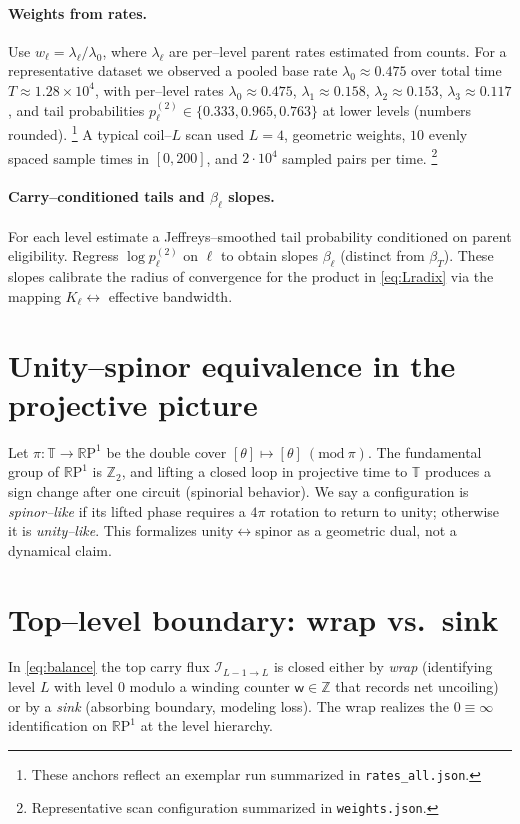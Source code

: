 \documentclass[11pt]{article}
\newcommand{\Z}{\mathbb{Z}}
\newcommand{\T}{\mathbb{T}} %
\newcommand{\RP}{\mathbb{R}\mathrm{P}^1}
\begin{document}
\paragraph{Weights from rates.}
Use $w_\ell=\lambda_\ell/\lambda_0$, where $\lambda_\ell$ are per--level parent rates estimated from counts.
For a representative dataset we observed a pooled base rate $\lambda_0\approx 0.475$ over total time $T\approx 1.28\times 10^4$, with per--level rates $\lambda_0\approx 0.475$, $\lambda_1\approx 0.158$, $\lambda_2\approx 0.153$, $\lambda_3\approx 0.117$, and tail probabilities $p^{(2)}_\ell\in\{0.333,0.965,0.763\}$ at lower levels (numbers rounded).%
\footnote{These anchors reflect an exemplar run summarized in \texttt{rates\_all.json}.}
A typical coil--$L$ scan used $L=4$, geometric weights, $10$ evenly spaced sample times in $[0,200]$, and $2\cdot 10^4$ sampled pairs per time.%
\footnote{Representative scan configuration summarized in \texttt{weights.json}.}

\paragraph{Carry--conditioned tails and $\beta_\ell$ slopes.}
For each level estimate a Jeffreys--smoothed tail probability conditioned on parent eligibility. Regress $\log p^{(2)}_\ell$ on $\ell$ to obtain slopes $\beta_\ell$ (distinct from $\beta_T$). These slopes calibrate the radius of convergence for the product in \eqref{eq:Lradix} via the mapping $K_\ell\leftrightarrow$ effective bandwidth.

\section{Unity--spinor equivalence in the projective picture}
\label{sec:spinor}
Let $\pi:\T\to \RP$ be the double cover $[\theta]\mapsto [\theta]\ (\mathrm{mod}\ \pi)$. The fundamental group of $\RP$ is $\Z_2$, and lifting a closed loop in projective time to $\T$ produces a sign change after one circuit (spinorial behavior). We say a configuration is \emph{spinor--like} if its lifted phase requires a $4\pi$ rotation to return to unity; otherwise it is \emph{unity--like}. This formalizes unity$\leftrightarrow$spinor as a geometric dual, not a dynamical claim.

\section{Top--level boundary: wrap vs.\ sink}
\label{sec:wrap}
In \eqref{eq:balance} the top carry flux $\mathcal{I}_{L-1\to L}$ is closed either by \emph{wrap} (identifying level $L$ with level $0$ modulo a winding counter $\mathsf{w}\in\Z$ that records net uncoiling) or by a \emph{sink} (absorbing boundary, modeling loss). The wrap realizes the $0\equiv\infty$ identification on $\RP$ at the level hierarchy.
\end{document}
